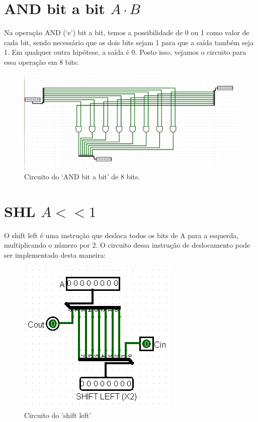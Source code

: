 \documentclass[
	12pt,				%
	openright,			%
	twoside,			%
	a4paper,			%
	english,			%
	french,				%
	spanish,			%
	brazil,				%
	]{abntex2}
\begin{document}
\section{AND bit a bit \texorpdfstring{$A\cdot B$}{Lg}}

Na operação AND (‘e’) bit a bit, temos a possibilidade de 0 ou 1 como valor de cada bit, sendo necessário que os dois bits sejam 1 para que a saída também seja 1. Em qualquer outra hipótese, a saída é 0. Posto isso, vejamos o circuito para essa operação em 8 bits:

\begin{figure}[H]
	\begin{center}
	    \includegraphics[scale=0.4]{andcircuito.png}
	\end{center}
\caption{\label{and}Circuito do ‘AND bit a bit’ de 8 bits.}
\end{figure}

\section{SHL \texorpdfstring{$A << 1$}{Lg}}

O shift left é uma instrução que desloca todos os bits de A para a esquerda, multiplicando o número por 2. O circuito dessa instrução de deslocamento pode ser implementado desta maneira:

\begin{figure}[H]
	\begin{center}
	    \includegraphics[scale=0.6]{shiftleft.png}
	\end{center}
\caption{\label{shl}Circuito do 'shift left'}
\end{figure}
\end{document}

